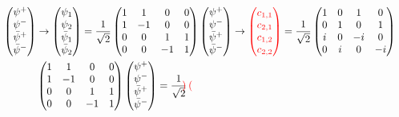 \documentclass[a4paper,11pt]{article}
\theoremstyle{remark}
\newcommand{\ra}{\rightarrow}
\newcommand{\psibar}{\bar{\psi}}
\newcommand*{\mathcolor}{}  %
\def\mathcolor#1#{\mathcoloraux{#1}}
\newcommand*{\mathcoloraux}[3]{%
  \protect\leavevmode
  \begingroup
    \color#1{#2}#3%
  \endgroup
}
\begin{document}
  \begin{align*}
  &\begin{aligned}
   \begin{pmatrix} 
    \psi^+ \\ \psi^- \\ \psibar^+ \\ \psibar^-
   \end{pmatrix}
   & \ra 
   \begin{pmatrix}
   \psi_1\\ \psi_2 \\ \psibar_1 \\ \psibar_2 
   \end{pmatrix}
   = \frac{1}{\sqrt{2}}
   \begin{pmatrix}
   1 & 1 & 0 & 0\\ 1 & -1 & 0 & 0 \\ 0 & 0 & 1 & 1\\ 0 & 0 & -1 & 1 
   \end{pmatrix}
   \begin{pmatrix} 
    \psi^+ \\ \psi^- \\ \psibar^+ \\ \psibar^-
   \end{pmatrix}
   \ra
   \mathcolor{red}{\begin{pmatrix}
   c_{1,1}\\ c_{2,1} \\ c_{1,2} \\ c_{2,2} 
   \end{pmatrix}}
   = \frac{1}{\sqrt{2}}
   \begin{pmatrix}
   1 & 0 & 1 & 0\\ 0 & 1 & 0 & 1 \\  i & 0 & -i & 0\\ 0 & i & 0 & -i 
   \end{pmatrix}\\
   &\begin{pmatrix}
   1 & 1 & 0 & 0\\ 1 & -1 & 0 & 0 \\ 0 & 0 & 1 & 1\\ 0 & 0 & -1 & 1 
   \end{pmatrix}
   \begin{pmatrix} 
    \psi^+ \\ \psi^- \\ \psibar^+ \\ \psibar^-
   \end{pmatrix}
    = \frac{1}{\sqrt{2}}
   \mathcolor{red}{\begin{pmatrix}

\end{pmatrix}}
\end{aligned}
\end{align*}
\end{document}
